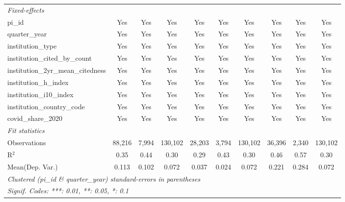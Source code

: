 \begin{tabular}{lccccccccc}
   \midrule
   \emph{Fixed-effects}\\
   pi\_id                                                      & Yes            & Yes           & Yes            & Yes            & Yes          & Yes            & Yes            & Yes           & Yes\\  
   quarter\_year                                               & Yes            & Yes           & Yes            & Yes            & Yes          & Yes            & Yes            & Yes           & Yes\\  
   institution\_type                                           & Yes            & Yes           & Yes            & Yes            & Yes          & Yes            & Yes            & Yes           & Yes\\  
   institution\_cited\_by\_count                               & Yes            & Yes           & Yes            & Yes            & Yes          & Yes            & Yes            & Yes           & Yes\\  
   institution\_2yr\_mean\_citedness                           & Yes            & Yes           & Yes            & Yes            & Yes          & Yes            & Yes            & Yes           & Yes\\  
   institution\_h\_index                                       & Yes            & Yes           & Yes            & Yes            & Yes          & Yes            & Yes            & Yes           & Yes\\  
   institution\_i10\_index                                     & Yes            & Yes           & Yes            & Yes            & Yes          & Yes            & Yes            & Yes           & Yes\\  
   institution\_country\_code                                  & Yes            & Yes           & Yes            & Yes            & Yes          & Yes            & Yes            & Yes           & Yes\\  
   covid\_share\_2020                                          & Yes            & Yes           & Yes            & Yes            & Yes          & Yes            & Yes            & Yes           & Yes\\  
   \midrule
   \emph{Fit statistics}\\
   Observations                                                & 88,216         & 7,994         & 130,102        & 28,203         & 3,794        & 130,102        & 36,396         & 2,340         & 130,102\\  
   R$^2$                                                       & 0.35           & 0.44          & 0.30           & 0.29           & 0.43         & 0.30           & 0.46           & 0.57          & 0.30\\  
Mean(Dep. Var.) & 0.113 & 0.102 & 0.072 & 0.037 & 0.024 & 0.072 & 0.221 & 0.284 & 0.072 \\
   \midrule \midrule
   \multicolumn{10}{l}{\emph{Clustered (pi\_id \& quarter\_year) standard-errors in parentheses}}\\
   \multicolumn{10}{l}{\emph{Signif. Codes: ***: 0.01, **: 0.05, *: 0.1}}\\
\end{tabular}
\par\endgroup

